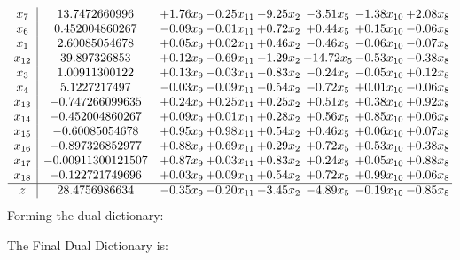 \documentclass[8pt]{article}
\begin{document}
\[\begin{array}{c| c c@{\hskip 2pt} c@{\hskip 2pt} c@{\hskip 2pt} c@{\hskip 2pt} c@{\hskip 2pt} c@{\hskip 2pt} }
 x_{7}   &  13.7472660996 & +  1.76 x_{9} & -0.25 x_{11} & -9.25 x_{2} & -3.51 x_{5} & -1.38 x_{10} & +  2.08 x_{8}\\
 x_{6}   &  0.452004860267 & -0.09 x_{9} & -0.01 x_{11} & +  0.72 x_{2} & +  0.44 x_{5} & +  0.15 x_{10} & -0.06 x_{8}\\
 x_{1}   &  2.60085054678 & +  0.05 x_{9} & +  0.02 x_{11} & +  0.46 x_{2} & -0.46 x_{5} & -0.06 x_{10} & -0.07 x_{8}\\
 x_{12}   &  39.897326853 & +  0.12 x_{9} & -0.69 x_{11} & -1.29 x_{2} & -14.72 x_{5} & -0.53 x_{10} & -0.38 x_{8}\\
 x_{3}   &  1.00911300122 & +  0.13 x_{9} & -0.03 x_{11} & -0.83 x_{2} & -0.24 x_{5} & -0.05 x_{10} & +  0.12 x_{8}\\
 x_{4}   &  5.1227217497 & -0.03 x_{9} & -0.09 x_{11} & -0.54 x_{2} & -0.72 x_{5} & +  0.01 x_{10} & -0.06 x_{8}\\
 x_{13}   &  -0.747266099635 & +  0.24 x_{9} & +  0.25 x_{11} & +  0.25 x_{2} & +  0.51 x_{5} & +  0.38 x_{10} & +  0.92 x_{8}\\
 x_{14}   &  -0.452004860267 & +  0.09 x_{9} & +  0.01 x_{11} & +  0.28 x_{2} & +  0.56 x_{5} & +  0.85 x_{10} & +  0.06 x_{8}\\
 x_{15}   &  -0.60085054678 & +  0.95 x_{9} & +  0.98 x_{11} & +  0.54 x_{2} & +  0.46 x_{5} & +  0.06 x_{10} & +  0.07 x_{8}\\
 x_{16}   &  -0.897326852977 & +  0.88 x_{9} & +  0.69 x_{11} & +  0.29 x_{2} & +  0.72 x_{5} & +  0.53 x_{10} & +  0.38 x_{8}\\
 x_{17}   &  -0.00911300121507 & +  0.87 x_{9} & +  0.03 x_{11} & +  0.83 x_{2} & +  0.24 x_{5} & +  0.05 x_{10} & +  0.88 x_{8}\\
 x_{18}   &  -0.122721749696 & +  0.03 x_{9} & +  0.09 x_{11} & +  0.54 x_{2} & +  0.72 x_{5} & +  0.99 x_{10} & +  0.06 x_{8}\\
\hline
z    &  28.4756986634 & -0.35 x_{9} & -0.20 x_{11} & -3.45 x_{2} & -4.89 x_{5} & -0.19 x_{10} & -0.85 x_{8}\\
\end{array}\]
Forming the dual dictionary:

The Final Dual Dictionary is: 
\end{document}
